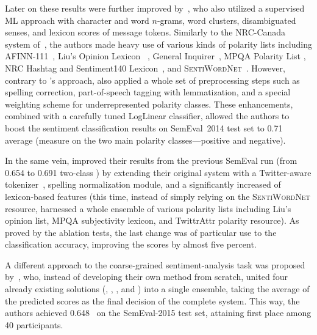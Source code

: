 

Later on these results were further improved by~\citet{Miura:14}, who
also utilized a supervised ML approach with character and word
$n$-grams, word clusters, disambiguated senses, and lexicon scores of
message tokens.  Similarly to the NRC-Canada system
of~\citet{Mohammad:13}, the authors made heavy use of various kinds of
polarity lists including AFINN-111~\cite{Nielsen:11}, Liu's Opinion
Lexicon~\cite{Hu:04} , General Inquirer~\cite{Stone:66}, MPQA Polarity
List \cite{Wiebe:05a}, NRC Hashtag and Sentiment140
Lexicon~\cite{Mohammad:13}, and
\textsc{SentiWordNet}~\cite{Esuli:06a}.  However, contrary to
\citeauthor{Mohammad:13}'s approach, \citeauthor{Miura:14} also
applied a whole set of preprocessing steps such as spelling
correction, part-of-speech tagging with lemmatization, and a special
weighting scheme for underrepresented polarity classes.  These
enhancements, combined with a carefully tuned LogLinear classifier,
allowed the authors to boost the sentiment classification results on
SemEval~2014 test set to 0.71 average \F (measure on the two main
polarity classes---positive and negative).


In the same vein, \citet{Guenther:14} improved their results from the
previous SemEval run (from 0.654 to 0.691 two-class \F) by extending
their original system with a Twitter-aware
tokenizer~\cite{Owoputi:13}, spelling normalization module, and a
significantly increased of lexicon-based features (this time, instead
of simply relying on the \textsc{SentiWordNet} resource,
\citeauthor{Guenther:14} harnessed a whole ensemble of various
polarity lists including Liu's opinion list, MPQA subjectivity
lexicon, and TwittrAttr polarity resource).  As proved by the ablation
tests, the last change was of particular use to the classification
accuracy, improving the scores by almost five percent.



A different approach to the coarse-grained sentiment-analysis task was
proposed by~\citet{Hagen:15}, who, instead of developing their own
method from scratch, united four already existing solutions
(\citet{Mohammad:13}, \citet{Guenther:13}, \citet{Proisl:13}, and
\citet{Miura:14}) into a single ensemble, taking the average of the
predicted scores as the final decision of the complete system.  This
way, the authors achieved 0.648~\F{} on the SemEval-2015 test set,
attaining first place among 40 participants.

